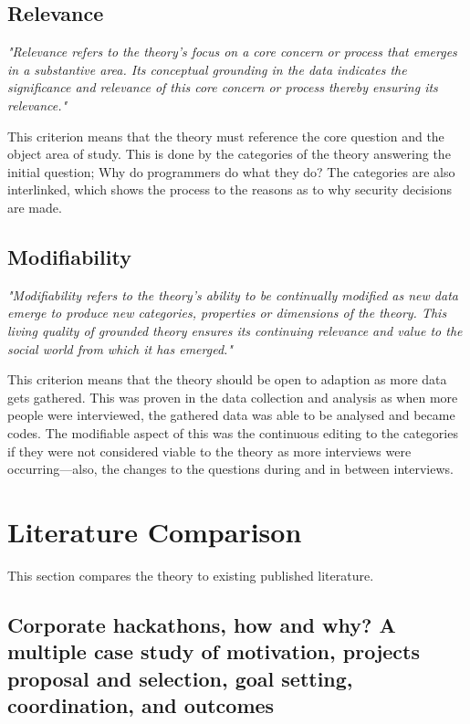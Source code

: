 \subsection{Relevance}

\textit{"Relevance refers to the theory’s focus on a core concern or process that emerges in a substantive area. Its conceptual grounding in the data indicates the significance and relevance of this core concern or process thereby ensuring its relevance." \cite{crit}}
\newline
\par 
This criterion means that the theory must reference the core question and the object area of study. This is done by the categories of the theory answering the initial question; Why do programmers do what they do? The categories are also interlinked, which shows the process to the reasons as to why security decisions are made. 

\subsection{Modifiability}

\textit{"Modifiability refers to the theory’s ability to be continually modified as new data emerge to produce new categories, properties or dimensions of the theory. This living quality of grounded theory ensures its continuing relevance and value to the social world from which it has emerged."\cite{crit}}
\newline
\par 
This criterion means that the theory should be open to adaption as more data gets gathered. This was proven in the data collection and analysis as when more people were interviewed, the gathered data was able to be analysed and became codes. The modifiable aspect of this was the continuous editing to the categories if they were not considered viable to the theory as more interviews were occurring—also, the changes to the questions during and in between interviews. 

\section{Literature Comparison}

This section compares the theory to existing published literature. 

\subsection{Corporate hackathons, how and why? A multiple case study of motivation, projects proposal and selection, goal setting, coordination, and outcomes}

